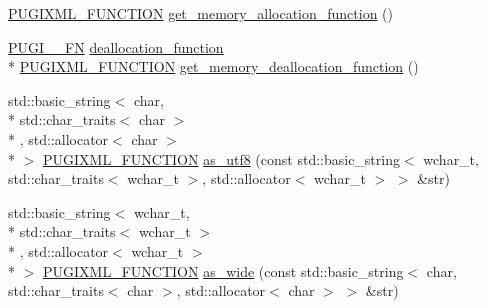 \begin{DoxyCompactItemize}
\hyperlink{pugixml_8hpp_a3d91f8ab11645e6dac8783d86d152b31}{P\-U\-G\-I\-X\-M\-L\-\_\-\-F\-U\-N\-C\-T\-I\-O\-N} \hyperlink{namespacepugi_a0d3d42320b07fe1865feb5e8e7c01e38}{get\-\_\-memory\-\_\-allocation\-\_\-function} ()
\item 
\hyperlink{pugixml_8cpp_a82c335af3ca48cdb209c506bf8dd6ad2}{P\-U\-G\-I\-\_\-\-\_\-\-F\-N} \hyperlink{namespacepugi_aa6161e8d6344110788d7ff8a11ca680b}{deallocation\-\_\-function} \\*
\hyperlink{pugixml_8hpp_a3d91f8ab11645e6dac8783d86d152b31}{P\-U\-G\-I\-X\-M\-L\-\_\-\-F\-U\-N\-C\-T\-I\-O\-N} \hyperlink{namespacepugi_a0823c1cb767482d9d72d1df055be3b67}{get\-\_\-memory\-\_\-deallocation\-\_\-function} ()
\item 
std\-::basic\-\_\-string$<$ char, \\*
std\-::char\-\_\-traits$<$ char $>$\\*
, std\-::allocator$<$ char $>$\\*
 $>$ \hyperlink{pugixml_8hpp_a3d91f8ab11645e6dac8783d86d152b31}{P\-U\-G\-I\-X\-M\-L\-\_\-\-F\-U\-N\-C\-T\-I\-O\-N} \hyperlink{namespacepugi_a4167cd183b5a524d0310df50caa44a80}{as\-\_\-utf8} (const std\-::basic\-\_\-string$<$ wchar\-\_\-t, std\-::char\-\_\-traits$<$ wchar\-\_\-t $>$, std\-::allocator$<$ wchar\-\_\-t $>$ $>$ \&str)
\item 
std\-::basic\-\_\-string$<$ wchar\-\_\-t, \\*
std\-::char\-\_\-traits$<$ wchar\-\_\-t $>$\\*
, std\-::allocator$<$ wchar\-\_\-t $>$\\*
 $>$ \hyperlink{pugixml_8hpp_a3d91f8ab11645e6dac8783d86d152b31}{P\-U\-G\-I\-X\-M\-L\-\_\-\-F\-U\-N\-C\-T\-I\-O\-N} \hyperlink{namespacepugi_a14a429e10cd9296114544306b7228d09}{as\-\_\-wide} (const std\-::basic\-\_\-string$<$ char, std\-::char\-\_\-traits$<$ char $>$, std\-::allocator$<$ char $>$ $>$ \&str)
\end{DoxyCompactItemize}
